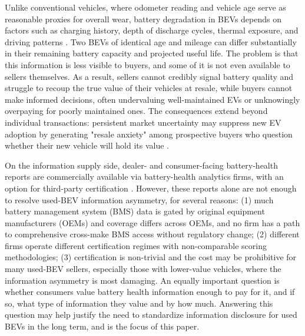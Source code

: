 \documentclass[a4paper,fleqn]{cas-sc}   %
\begin{document}
Unlike conventional vehicles, where odometer reading and vehicle age serve as reasonable proxies for overall wear, battery degradation in BEVs depends on factors such as charging history, depth of discharge cycles, thermal exposure, and driving patterns \parencite{bashashPluginHybridElectric2011, neubauerSensitivityBatteryElectric2012}. Two BEVs of identical age and mileage can differ substantially in their remaining battery capacity and projected useful life. The problem is that this information is less visible to buyers, and some of it is not even available to sellers themselves. As a result, sellers cannot credibly signal battery quality and struggle to recoup the true value of their vehicles at resale, while buyers cannot make informed decisions, often undervaluing well-maintained EVs or unknowingly overpaying for poorly maintained ones. The consequences extend beyond individual transactions: persistent market uncertainty may suppress new EV adoption by generating "resale anxiety" among prospective buyers who question whether their new vehicle will hold its value \parencite{bruckmannResaleAnxietyObstacle2021}. 

On the information supply side, dealer- and consumer-facing battery-health reports are commercially available via battery-health analytics firms, with an option for third-party certification \parencite{HomeAVILOO2026,BatteryTestingAnalytics2025,DriveElectricConfidence,CheckingTeslaBattery}. However, these reports alone are not enough to resolve used-BEV information asymmetry, for several reasons: (1) much battery management system (BMS) data is gated by original equipment manufacturers (OEMs) and coverage differs across OEMs, and no firm has a path to comprehensive cross-make BMS access without regulatory change; (2) different firms operate different certification regimes with non-comparable scoring methodologies; (3) certification is non-trivial and the cost may be prohibitive for many used-BEV sellers, especially those with lower-value vehicles, where the information asymmetry is most damaging. An equally important question is whether consumers value battery health information enough to pay for it, and if so, what type of information they value and by how much. Answering this question may help justify the need to standardize information disclosure for used BEVs in the long term, and is the focus of this paper.
\end{document}
